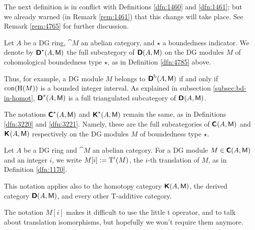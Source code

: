 The next definition is in conflict with Definitions \ref{dfn:1460} and 
\ref{dfn:1461}; but we already warned (in Remark \ref{rem:1461}) that this 
change will take place. See Remark \ref{rem:4765} for further discussion. 

\begin{dfn} \label{dfn:2122}
Let $A$ be a DG ring, $\cat{M}$ an abelian category, and $\star$ a boundedness 
indicator. 
We denote by $\boldsymbol{\mathsf{D}}^{\star}(A, \operatorname{\mathsf{M}})$%
%
%
%
the  full subcategory of $\boldsymbol{\mathsf{D}}(A, \operatorname{\mathsf{M}})$ 
on the DG modules $M$ of cohomological boundedness type $\star$, as in 
Definition \ref{dfn:4785} above. 
\end{dfn}

Thus, for example,  a DG module $M$ belongs to 
$\boldsymbol{\mathsf{D}}^{\mathrm{b}}(A, \operatorname{\mathsf{M}})$ if and only if 
$\operatorname{con}(\operatorname{H}(M))$ is a bounded integer interval. 
As explained in subsection \ref{subsec:bd-in-homot}, 
$\boldsymbol{\mathsf{D}}^{\star}(A, \operatorname{\mathsf{M}})$ is a full triangulated subcategory of 
$\boldsymbol{\mathsf{D}}^{}(A, \operatorname{\mathsf{M}})$.

The notations $\boldsymbol{\mathsf{C}}^{\star}(A, \operatorname{\mathsf{M}})$ and 
$\boldsymbol{\mathsf{K}}^{\star}(A, \operatorname{\mathsf{M}})$
remain the same, as in Definitions \ref{dfn:3220} and \ref{dfn:3221}. 
Namely, these are the full subcategories of $\boldsymbol{\mathsf{C}}^{}(A, \operatorname{\mathsf{M}})$ 
and $\boldsymbol{\mathsf{K}}^{}(A, \operatorname{\mathsf{M}})$ respectively on the DG modules $M$ 
of boundedness type $\star$.%
%
%
%

\begin{dfn} \label{dfn:2120}
Let $A$ be a DG ring and $\cat{M}$ an abelian category. 
For a DG module $M \in \boldsymbol{\mathsf{C}}(A, \operatorname{\mathsf{M}})$ and an integer $i$, we write 
$M[i] := \operatorname{T}^i(M)$,
the $i$-th translation of $M$, 
as in Definition \ref{dfn:1170}.%
%
%

This notation applies also to the homotopy category $\boldsymbol{\mathsf{K}}(A, \operatorname{\mathsf{M}})$,
the derived category $\boldsymbol{\mathsf{D}}(A, \operatorname{\mathsf{M}})$, and every other T-additive 
category. 
\end{dfn}

The notation $M[i]$ makes it difficult to use the little t operator, and to 
talk about translation isomorphisms, but hopefully we won't require them 
anymore.

